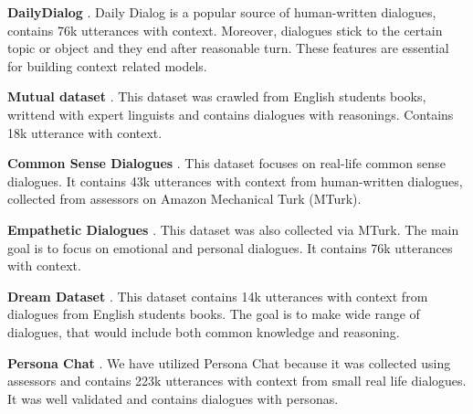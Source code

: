 \textbf{DailyDialog} \cite{Li-Su-2017}. Daily Dialog is a popular source of human-written dialogues, contains 76k utterances with context. Moreover, dialogues stick to the certain topic or object and they end after reasonable turn. These features are essential for building context related models.

\smallskip

\textbf{Mutual dataset} \cite{cui-etal-2020-mutual}. This dataset was crawled from English students books, writtend with expert linguists and contains dialogues with reasonings. Contains 18k utterance with context.

\smallskip

\textbf{Common Sense Dialogues} \cite{Zhou-2021}. This dataset focuses on real-life common sense dialogues. It contains 43k utterances with context from human-written dialogues, collected from assessors on Amazon Mechanical Turk (MTurk).

\smallskip


\textbf{Empathetic Dialogues} \cite{Rashkin-2018}. This dataset was also collected via MTurk. The main goal is to focus on emotional and personal dialogues. It contains 76k utterances with context.

\smallskip

\textbf{Dream Dataset} \cite{Sun-2019}. This dataset contains 14k utterances with context from dialogues from English students books. The goal is to make wide range of dialogues, that would include both common knowledge and reasoning.

\smallskip

\textbf{Persona Chat} \cite{Zhang-2018}. We have utilized Persona Chat because it was collected using assessors and contains 223k utterances with context from small real life dialogues. It was well validated and contains dialogues with personas.